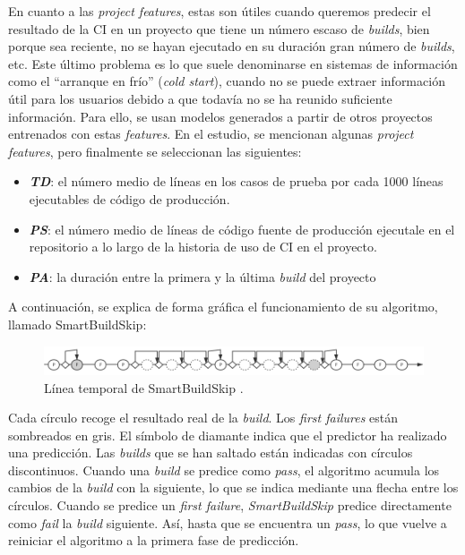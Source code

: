 En cuanto a las \textit{project features}, estas son útiles cuando queremos predecir
el resultado de la CI en un proyecto que tiene un número escaso de \textit{builds}, bien
porque sea reciente, no se hayan ejecutado en su duración gran número de \textit{builds}, etc. Este
último problema es lo que suele denominarse en sistemas de información como el ``arranque en frío''
(\textit{cold start}), cuando no se puede extraer información útil para los usuarios debido a
que todavía no se ha reunido suficiente información. Para ello, se usan modelos generados a partir
de otros proyectos entrenados con estas \textit{features}. En el estudio, se mencionan algunas
\textit{project features}, pero finalmente se seleccionan las siguientes:

\begin{itemize}
      \item \textbf{\textit{TD}}: el número medio de líneas en los casos de prueba por cada
      1000 líneas ejecutables de código de producción.
      \item \textbf{\textit{PS}}: el número medio de líneas de código fuente de producción
      ejecutale en el repositorio a lo largo de la historia de uso de CI en el proyecto.
      \item \textbf{\textit{PA}}: la duración entre la primera y la última \textit{build} del
      proyecto
\end{itemize}


\noindent A continuación, se explica de forma gráfica el funcionamiento de su algoritmo, llamado
SmartBuildSkip:

\begin{figure}[H]
      \centering
      \includegraphics[scale=0.49]{images/SBS.png}
      \caption{Línea temporal de SmartBuildSkip \cite{2}.}
      \label{fig:timeline SBS}
\end{figure}

Cada círculo recoge el resultado real de la \textit{build}. Los \textit{first failures} están
sombreados en gris. El símbolo de diamante indica que el predictor ha realizado una predicción.
Las \textit{builds} que se han saltado están indicadas con círculos discontinuos. Cuando una
\textit{build} se predice como \textit{pass}, el algoritmo acumula los cambios de la
\textit{build} con la siguiente, lo que se indica mediante una flecha entre los círculos. Cuando
se predice un \textit{first failure}, \textit{SmartBuildSkip} predice directamente como
\textit{fail} la \textit{build} siguiente. Así, hasta que se encuentra un \textit{pass}, lo que
vuelve a reiniciar el algoritmo a la primera fase de predicción.\\

